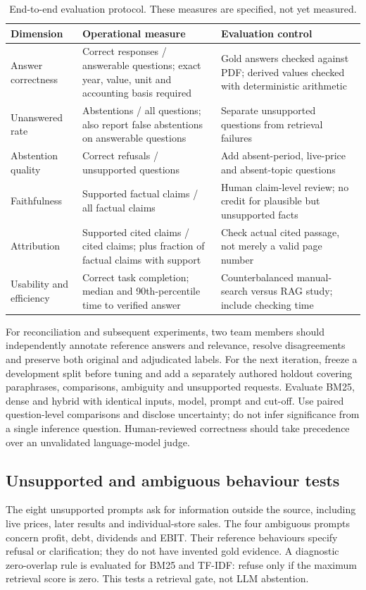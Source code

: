 \documentclass[11pt,a4paper]{article}
\begin{document}
\begin{table}[htbp]\centering\small
\caption{End-to-end evaluation protocol. These measures are specified, not yet measured.}
\begin{tabularx}{\textwidth}{p{30mm}Y Y}\toprule
Dimension & Operational measure & Evaluation control\\\midrule
Answer correctness & Correct responses / answerable questions; exact year, value, unit and accounting basis required & Gold answers checked against PDF; derived values checked with deterministic arithmetic\\
Unanswered rate & Abstentions / all questions; also report false abstentions on answerable questions & Separate unsupported questions from retrieval failures\\
Abstention quality & Correct refusals / unsupported questions & Add absent-period, live-price and absent-topic questions\\
Faithfulness & Supported factual claims / all factual claims & Human claim-level review; no credit for plausible but unsupported facts\\
Attribution & Supported cited claims / cited claims; plus fraction of factual claims with support & Check actual cited passage, not merely a valid page number\\
Usability and efficiency & Correct task completion; median and 90th-percentile time to verified answer & Counterbalanced manual-search versus RAG study; include checking time\\\bottomrule
\end{tabularx}
\end{table}

For reconciliation and subsequent experiments, two team members should independently annotate reference answers and relevance, resolve disagreements and preserve both original and adjudicated labels. For the next iteration, freeze a development split before tuning and add a separately authored holdout covering paraphrases, comparisons, ambiguity and unsupported requests. Evaluate BM25, dense and hybrid with identical inputs, model, prompt and cut-off. Use paired question-level comparisons and disclose uncertainty; do not infer significance from a single inference question. Human-reviewed correctness should take precedence over an unvalidated language-model judge.

\subsection{Unsupported and ambiguous behaviour tests}
The eight unsupported prompts ask for information outside the source, including live prices, later results and individual-store sales. The four ambiguous prompts concern profit, debt, dividends and EBIT. Their reference behaviours specify refusal or clarification; they do not have invented gold evidence. A diagnostic zero-overlap rule is evaluated for BM25 and TF-IDF: refuse only if the maximum retrieval score is zero. This tests a retrieval gate, not LLM abstention.
\end{document}
